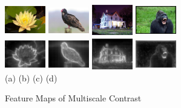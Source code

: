 \documentclass[10pt,twocolumn,letterpaper]{article}
\newcommand{\hs}{\hspace{0.58in}}
\begin{document}
\begin{figure}[h]
    \begin{center}
    \includegraphics[width=0.7in,height=0.54in]{./Figures/contrast/1orig.jpg}
    \includegraphics[width=0.7in,height=0.54in]{./Figures/contrast/2orig.jpg}
    \includegraphics[width=0.7in,height=0.54in]{./Figures/contrast/3orig.jpg}
    \includegraphics[width=0.7in,height=0.54in]{./Figures/contrast/4orig.jpg}\\
    \includegraphics[width=0.7in,height=0.54in]{./Figures/contrast/1cont.jpg}
    \includegraphics[width=0.7in,height=0.54in]{./Figures/contrast/2cont.jpg}
    \includegraphics[width=0.7in,height=0.54in]{./Figures/contrast/3cont.jpg}
    \includegraphics[width=0.7in,height=0.54in]{./Figures/contrast/4cont.jpg}\\
    \footnotesize \hspace{0.1cm} (a) \hs (b) \hs  (c) \hs (d) \\
\caption{Feature Maps of Multiscale Contrast} \label{Fig:LocalFeatureMap}
    \end{center}
\end{figure}
\end{document}
